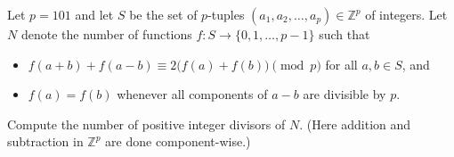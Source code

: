 Let $p = 101$ and let $S$ be the set of $p$-tuples $(a_1, a_2, \dots, a_p) \in \mathbb{Z}^p$ of integers. Let $N$ denote the number of functions $f: S \to \{0, 1, \dots, p-1\}$ such that
\begin{itemize}
	\item $f(a + b) + f(a - b) \equiv 2\big(f(a) + f(b)\big) \pmod{p}$ for all $a, b \in S$, and
	\item $f(a) = f(b)$ whenever all components of $a-b$ are divisible by $p$.
\end{itemize}
Compute the number of positive integer divisors of $N$. (Here addition and subtraction in $\mathbb{Z}^p$ are done component-wise.)
